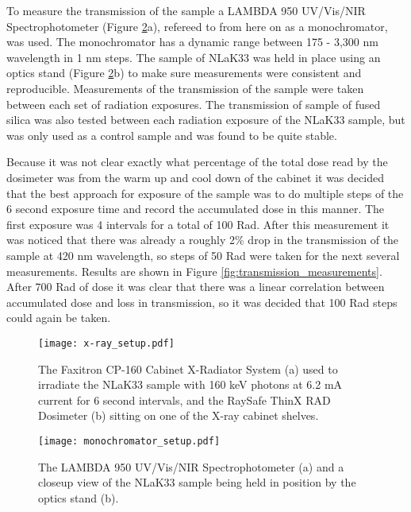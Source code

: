 To measure the transmission of the sample a LAMBDA 950 UV/Vis/NIR Spectrophotometer \cite{Monochromator} (Figure \ref{fig:monochromator_setup}a), refereed to from here on as a monochromator, was used. The monochromator has a dynamic range between 175 - 3,300 nm wavelength in 1 nm steps. The sample of NLaK33 was held in place using an optics stand (Figure \ref{fig:monochromator_setup}b) to make sure measurements were consistent and reproducible. Measurements of the transmission of the sample were taken between each set of radiation exposures. The transmission of sample of fused silica was also tested between each radiation exposure of the NLaK33 sample, but was only used as a control sample and was found to be quite stable.

Because it was not clear exactly what percentage of the total dose read by the dosimeter was from the warm up and cool down of the cabinet it was decided that the best approach for exposure of the sample was to do multiple steps of the 6 second exposure time and record the accumulated dose in this manner. The first exposure was 4 intervals for a total of 100 Rad. After this measurement it was noticed that there was already a roughly 2\% drop in the transmission of the sample at 420 nm wavelength, so steps of 50 Rad were taken for the next several measurements. Results are shown in Figure \ref{fig:transmission_measurements}. After 700 Rad of dose it was clear that there was a linear correlation between accumulated dose and loss in transmission, so it was decided that 100 Rad steps could again be taken.


\begin{figure}[!htb]
	\centering
	\texttt{[image: x-ray\_setup.pdf]}
	\caption{The Faxitron CP-160 Cabinet X-Radiator System (a) used to irradiate the NLaK33 sample with 160 keV photons at 6.2 mA current for 6 second intervals, and the RaySafe ThinX RAD Dosimeter (b) sitting on one of the X-ray cabinet shelves.}
	\label{fig:x-ray_setup}
\end{figure}


\begin{figure}[!htb]
	\centering
	\texttt{[image: monochromator\_setup.pdf]}
	\caption{The LAMBDA 950 UV/Vis/NIR Spectrophotometer (a) and a closeup view of the NLaK33 sample being held in position by the optics stand (b).}
	\label{fig:monochromator_setup}
\end{figure}

